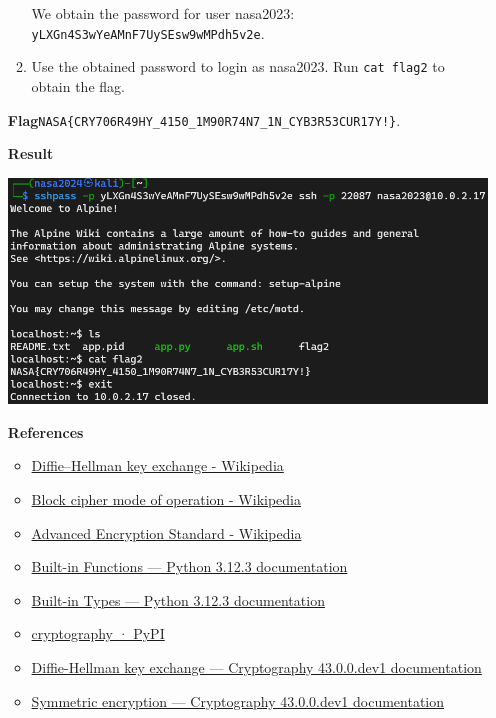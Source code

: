 \documentclass[12pt, a4paper]{article}
\begin{document}
\begin{enumerate}[label=(\alph*)]
\begin{enumerate}[label=(\arabic*)]
      We obtain the password for user nasa2023: \verb|yLXGn4S3wYeAMnF7UySEsw9wMPdh5v2e|.

      \item Use the obtained password to login as nasa2023. Run \verb|cat flag2| to obtain the flag.
    \end{enumerate}

    \textbf{Flag}\quad\verb|NASA{CRY706R49HY_4150_1M90R74N7_1N_CYB3R53CUR17Y!}|.

    \textbf{Result}

    \includegraphics[width=0.9\linewidth]{1-b_result.png}

    \textbf{References}
    \begin{itemize}
      \item \href{https://en.wikipedia.org/wiki/Diffie%E2%80%93Hellman_key_exchange}{Diffie–Hellman key exchange - Wikipedia}
      \item \href{https://en.wikipedia.org/wiki/Block_cipher_mode_of_operation}{Block cipher mode of operation - Wikipedia}
      \item \href{https://en.wikipedia.org/wiki/Advanced_Encryption_Standard}{Advanced Encryption Standard - Wikipedia}
      \item \href{https://docs.python.org/3/library/functions.html}{Built-in Functions — Python 3.12.3 documentation}
      \item \href{https://docs.python.org/3/library/stdtypes.html}{Built-in Types — Python 3.12.3 documentation}
      \item \href{https://pypi.org/project/cryptography/}{cryptography · PyPI}
      \item \href{https://cryptography.io/en/latest/hazmat/primitives/asymmetric/dh/}{Diffie-Hellman key exchange — Cryptography 43.0.0.dev1 documentation}
      \item \href{https://cryptography.io/en/latest/hazmat/primitives/symmetric-encryption/}{Symmetric encryption — Cryptography 43.0.0.dev1 documentation}
    \end{itemize}


\end{enumerate}
\end{document}
